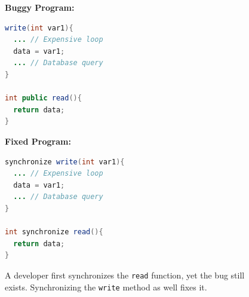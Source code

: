 \documentclass{llncs}
\begin{document}
\begin{figure}[h]
\begin{minipage}{5cm}
\footnotesize{\textbf{Buggy Program:}}
\begin{lstlisting}[language=Java, morekeywords={synchronize}]
write(int var1){
  ... // Expensive loop
  data = var1;
  ... // Database query
}

int public read(){
  return data;
}
\end{lstlisting}
\end{minipage}\hfill
\begin{minipage}{5cm}
\footnotesize{\textbf{Fixed Program:}}
\begin{lstlisting}[language=Java, morekeywords={synchronize}]
synchronize write(int var1){
  ... // Expensive loop
  data = var1;
  ... // Database query
}

int synchronize read(){
  return data;
}
\end{lstlisting}
\end{minipage}
\caption{A developer first synchronizes the \texttt{read} function, yet the bug
still exists. Synchronizing the \texttt{write} method as well fixes it.}
\label{fig:fixed_sample_datarace}
\end{figure}

%
%
\end{document}
